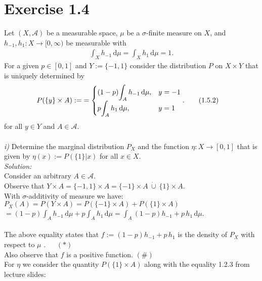 \documentclass{article}
\begin{document}
\section*{Exercise 1.4}
Let $(X,\mathcal{A})$ be a measurable space, $\mu$ be a $\sigma$-finite measure on $X$, and $h_{-1}, h_1:X \rightarrow [0,\infty)$ be measurable with 
\begin{align*}
\displaystyle{ \int_{X} h_{-1} \, \text{d}\mu = \int_{X} h_{1} \, \text{d}\mu = 1. } \tag{1.5.1}
\end{align*}
For a given $p\in [0,1]$ and $Y:= \{ -1,1 \}$ consider the distribution $P$ on $X \times Y$ that is uniquely determined by 
\begin{align*}
P(\{ y \} \times A) := 
 & = \begin{cases} 
 (1-p)\displaystyle{\int_A h_{-1} \, \text{d}\mu }, & y = -1 \cr  
 p \displaystyle{\int_A h_{1} \, \text{d}\mu }, &y = 1 
\end{cases}. \tag{1.5.2}
\end{align*}
for all $y\in Y$ and $A\in \mathcal{A}$.\\
\\
\textsl{i)} Determine the marginal distribution $P_X$ and the function $\eta:X\rightarrow [0,1]$ that is given by $\eta(x):=P(\{ 1 \}| x)$ for all $x\in X$. \vspace{0.5em}\\
\textsl{Solution:} \\
Consider an arbitrary $A\in\mathcal{A}$. \\
Observe that $Y\times A = \{ -1,1 \} \times A = \{-1\} \times A \ \dot{\cup} \ \{1\} \times A $. \\
With $\sigma$-additivity of measure we have: \\
$P_X(A) = P(Y\times A) =  P( \{-1\} \times A )+P( \{1\} \times A) $ \\
\hspace*{3.1cm}$= \displaystyle{ (1-p)\int_A h_{-1} \,\text{d}\mu + p\int_A h_{1}\, \text{d}\mu = \int_A (1-p)h_{-1}+p\, h_{1}\, \text{d}\mu } $.\\
\vspace*{-1em} \\
The above equality states that $f:=(1-p)h_{-1}+p\, h_{1}$ is the density of $P_X$ with respect to $\mu$ . $\quad \  (*)$ \\
Also observe that $f$ is a positive function. \hspace{8.3cm}$ (\#)$\\
For $\eta$ we consider the quantity $P(\{ 1\} \times A)$ along with the equality 1.2.3 from lecture slides:\\
\end{document}
